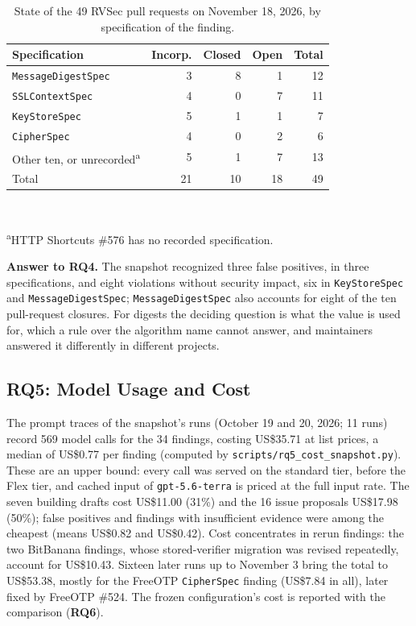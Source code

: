 \documentclass[conference]{IEEEtran}
\newcommand{\researchq}[1]{\textbf{RQ#1}}
\begin{document}
\begin{table}[H]
\centering
\caption{State of the 49 RVSec pull requests on November 18, 2026, by
specification of the finding.}
\label{tab:pr-spec}
\footnotesize
\begin{tabular}{lrrrr}
\toprule
Specification & Incorp. & Closed & Open & Total \\
\midrule
\texttt{MessageDigestSpec} & 3 & 8 & 1 & 12 \\
\texttt{SSLContextSpec}    & 4 & 0 & 7 & 11 \\
\texttt{KeyStoreSpec}      & 5 & 1 & 1 & 7 \\
\texttt{CipherSpec}        & 4 & 0 & 2 & 6 \\
Other ten, or unrecorded\textsuperscript{a} & 5 & 1 & 7 & 13 \\
\midrule
Total & 21 & 10 & 18 & 49 \\
\bottomrule
\end{tabular}
\\[2pt]\raggedright\scriptsize\textsuperscript{a}HTTP Shortcuts \#576 has no
recorded specification.
\end{table}

\textbf{Answer to \researchq{4}.} The snapshot recognized three false
positives, in three specifications, and eight violations without security
impact, six in \texttt{KeyStoreSpec} and \texttt{MessageDigestSpec};
\texttt{MessageDigestSpec} also accounts for eight of the ten pull-request
closures. For digests the
deciding question is what the value is used for, which a rule over the
algorithm name cannot answer, and maintainers answered it differently in
different projects.

\subsection{\researchq{5}: Model Usage and Cost}

The prompt traces of the snapshot's runs (October 19 and 20, 2026;
11 runs) record 569 model calls for the 34 findings,
costing US\$35.71 at list prices, a median of US\$0.77 per
finding (computed by \texttt{scripts/rq5\_cost\_snapshot.py}). These are an upper bound: every call was served on the standard tier,
before the Flex tier, and cached input of \texttt{gpt-5.6-terra} is priced at
the full input rate. The seven
building drafts cost US\$11.00 (31\%) and the 16 issue
proposals US\$17.98 (50\%); false positives and findings
with insufficient evidence were among the cheapest (means US\$0.82 and
US\$0.42). Cost concentrates in rerun findings: the two BitBanana
findings, whose stored-verifier migration was revised repeatedly, account for
US\$10.43. Sixteen later runs up to November 3 bring the total to
US\$53.38, mostly for the FreeOTP \texttt{CipherSpec} finding
(US\$7.84 in all), later fixed by FreeOTP \#524. The frozen configuration's
cost is reported with the comparison (\researchq{6}).
\end{document}
